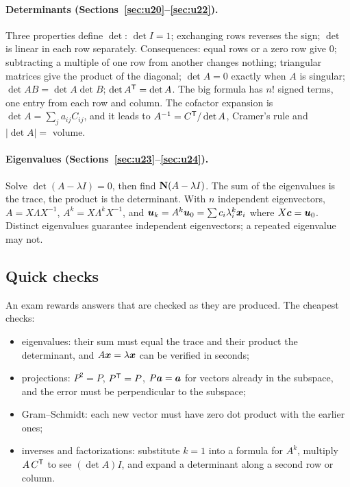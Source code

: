 \paragraph{Determinants (Sections~\ref{sec:u20}--\ref{sec:u22}).}
Three properties define $\det$: $\det I=1$; exchanging rows reverses the sign; $\det$ is
linear in each row separately. Consequences: equal rows or a zero row give $0$; subtracting a
multiple of one row from another changes nothing; triangular matrices give the product of the
diagonal; $\det A=0$ exactly when $A$ is singular; $\det AB=\det A\det B$; $\det A^{\mathsf{T}}=\det A$.
The big formula has $n!$ signed terms, one entry from each row and column. The cofactor
expansion is $\det A=\sum_j a_{ij}C_{ij}$, and it leads to $A^{-1}=C^{\mathsf{T}}/\det A$, Cramer's rule
and $|\det A|=$ volume.

\paragraph{Eigenvalues (Sections~\ref{sec:u23}--\ref{sec:u24}).}
Solve $\det(A-\lambda I)=0$, then find $\mathbf{N}(A-\lambda I)$. The sum of the eigenvalues is the
trace, the product is the determinant. With $n$ independent eigenvectors,
$A=X\Lambda X^{-1}$, $A^{k}=X\Lambda^{k}X^{-1}$, and
$\boldsymbol{u}_k=A^{k}\boldsymbol{u}_0=\sum c_i\lambda_i^{k}\boldsymbol{x}_i$ where $X\boldsymbol{c}=\boldsymbol{u}_0$. Distinct
eigenvalues guarantee independent eigenvectors; a repeated eigenvalue may not.

\subsection{Quick checks}

An exam rewards answers that are checked as they are produced. The cheapest checks:
\begin{itemize}
  \item eigenvalues: their sum must equal the trace and their product the determinant, and
  $A\boldsymbol{x}=\lambda\boldsymbol{x}$ can be verified in seconds;
  \item projections: $P^{2}=P$, $P^{\mathsf{T}}=P$, $P\boldsymbol{a}=\boldsymbol{a}$ for vectors already in the
  subspace, and the error must be perpendicular to the subspace;
  \item Gram--Schmidt: each new vector must have zero dot product with the earlier ones;
  \item inverses and factorizations: substitute $k=1$ into a formula for $A^{k}$, multiply
  $A\,C^{\mathsf{T}}$ to see $(\det A)I$, and expand a determinant along a second row or column.
\end{itemize}

